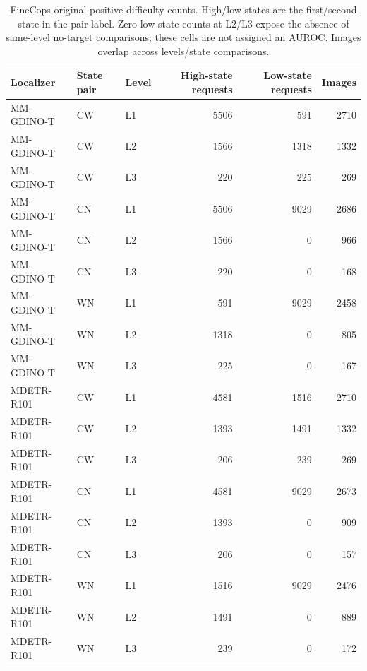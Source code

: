 \begin{table}[t]
\centering\footnotesize
\setlength{\tabcolsep}{3pt}
\renewcommand{\arraystretch}{1.15}
\caption{FineCops original-positive-difficulty counts. High/low states are the first/second state in the pair label. Zero low-state counts at L2/L3 expose the absence of same-level no-target comparisons; these cells are not assigned an AUROC. Images overlap across levels/state comparisons.}\label{tab:supp_v6_difficulty_counts}
\begin{tabular}{@{}lllrrr@{}}\toprule
Localizer & State pair & Level & High-state requests & Low-state requests & Images\\\midrule
MM-GDINO-T & CW & L1 & 5506 & 591 & 2710\\
MM-GDINO-T & CW & L2 & 1566 & 1318 & 1332\\
MM-GDINO-T & CW & L3 & 220 & 225 & 269\\
MM-GDINO-T & CN & L1 & 5506 & 9029 & 2686\\
MM-GDINO-T & CN & L2 & 1566 & 0 & 966\\
MM-GDINO-T & CN & L3 & 220 & 0 & 168\\
MM-GDINO-T & WN & L1 & 591 & 9029 & 2458\\
MM-GDINO-T & WN & L2 & 1318 & 0 & 805\\
MM-GDINO-T & WN & L3 & 225 & 0 & 167\\
MDETR-R101 & CW & L1 & 4581 & 1516 & 2710\\
MDETR-R101 & CW & L2 & 1393 & 1491 & 1332\\
MDETR-R101 & CW & L3 & 206 & 239 & 269\\
MDETR-R101 & CN & L1 & 4581 & 9029 & 2673\\
MDETR-R101 & CN & L2 & 1393 & 0 & 909\\
MDETR-R101 & CN & L3 & 206 & 0 & 157\\
MDETR-R101 & WN & L1 & 1516 & 9029 & 2476\\
MDETR-R101 & WN & L2 & 1491 & 0 & 889\\
MDETR-R101 & WN & L3 & 239 & 0 & 172\\
\bottomrule\end{tabular}
\end{table}
